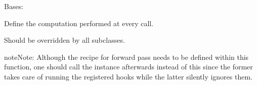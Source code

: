 \documentclass[letterpaper,10pt,english]{sphinxmanual}
\begin{document}
\begin{fulllineitems}
\label{\detokenize{train:train.ConvBlock}}
\pysigstartsignatures
\pysiglinewithargsret
{}
{\sphinxparamcomma {}}
{}
\pysigstopsignatures
\sphinxAtStartPar
Bases: 

\begin{fulllineitems}
\label{\detokenize{train:train.ConvBlock.forward}}
\pysigstartsignatures
\pysiglinewithargsret
{}
{}
{}
\pysigstopsignatures
\sphinxAtStartPar
Define the computation performed at every call.

\sphinxAtStartPar
Should be overridden by all subclasses.

\begin{sphinxadmonition}{note}{Note:}
\sphinxAtStartPar
Although the recipe for forward pass needs to be defined within
this function, one should call the  instance afterwards
instead of this since the former takes care of running the
registered hooks while the latter silently ignores them.
\end{sphinxadmonition}

\end{fulllineitems}


\end{fulllineitems}

\end{document}
